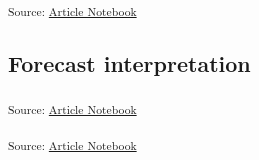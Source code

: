 \documentclass[
  letterpaper,
  DIV=11,
  numbers=noendperiod,
  oneside]{scrartcl}
\begin{document}
\textsubscript{Source:
\href{https://SJbrou.github.io/Supply_Chain_Data_Analysis/index.qmd.html}{Article
Notebook}}

\subsection{Forecast interpretation}\label{forecast-interpretation}

\textsubscript{Source:
\href{https://SJbrou.github.io/Supply_Chain_Data_Analysis/index.qmd.html}{Article
Notebook}}

\textsubscript{Source:
\href{https://SJbrou.github.io/Supply_Chain_Data_Analysis/index.qmd.html}{Article
Notebook}}
\end{document}
